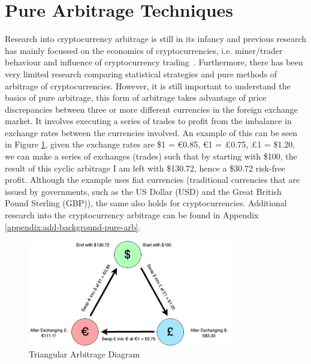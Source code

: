 \section{Pure Arbitrage Techniques}
\label{sec:pure-arb}
Research into cryptocurrency arbitrage is still in its infancy and previous research has mainly focussed on the economics of cryptocurrencies, i.e. miner/trader behaviour and influence of cryptocurrency trading~\cite{eyal2015miner, avarikioti2020ride, huberman2021monopoly, athey2016bitcoin, easley2019mining, harvey2016cryptofinance, pagnotta2018equilibrium}. Furthermore, there has been very limited research comparing statistical strategies and pure methods of arbitrage of cryptocurrencies. However, it is still important to understand the basics of pure arbitrage, this form of arbitrage takes advantage of price discrepancies between three or more different currencies in the foreign exchange market. It involves executing a series of trades to profit from the imbalance in exchange rates between the currencies involved. An example of this can be seen in Figure \ref{fig:tri-arb}, given the exchange rates are \$1 = \euro 0.85, \euro 1 = \pounds0.75, \pounds1 = \$1.20, we can make a series of exchanges (trades) such that by starting with \$100, the result of this cyclic arbitrage I am left with \$130.72, hence a \$30.72 risk-free profit. Although the example uses fiat currencies (traditional currencies that are issued by governments, such as the US Dollar (USD) and the Great British Pound Sterling (GBP)), the same also holds for cryptocurrencies. Additional research into the cryptocurrency arbitrage can be found in Appendix \ref{appendix:add-background-pure-arb}.

\begin{figure}[!htb]
    \centering
    \includegraphics[width=0.8\textwidth]{background/Images/arbitrage_diagram.png}
    \caption{Triangular Arbitrage Diagram\label{fig:tri-arb}}
\end{figure}

